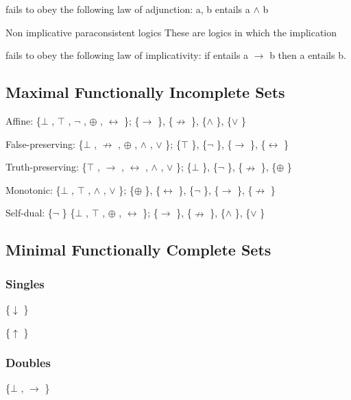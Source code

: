 fails to obey the following law of adjunction: a, b entails a $\land$  b

Non implicative paraconsistent logics These are logics in which the
implication

fails to obey the following law of implicativity: if entails a $\to$  b then
a entails b.

\hypertarget{maximal-functionally-incomplete-sets}{%
\subsection{Maximal Functionally Incomplete
Sets}\label{maximal-functionally-incomplete-sets}}

Affine: \{$\bot$ , $\top$ , $\neg$ , $\oplus$ , $\leftrightarrow$ \}; \{$\to$ \}, \{$\nrightarrow$ \}, \{$\land$ \}, \{$\lor$ \}

False-preserving: \{$\bot$ , $\nrightarrow$ , $\oplus$ , $\land$ , $\lor$ \}; \{$\top$ \}, \{$\neg$ \}, \{$\to$ \}, \{$\leftrightarrow$ \}

Truth-preserving: \{$\top$ , $\to$ , $\leftrightarrow$ , $\land$ , $\lor$ \}; \{$\bot$ \}, \{$\neg$ \}, \{$\nrightarrow$ \}, \{$\oplus$ \}

Monotonic: \{$\bot$ , $\top$ , $\land$ , $\lor$ \}; \{$\oplus$ \}, \{$\leftrightarrow$ \}, \{$\neg$ \}, \{$\to$ \}, \{$\nrightarrow$ \}

Self-dual: \{$\neg$ \} \{$\bot$ , $\top$ , $\oplus$ , $\leftrightarrow$ \}; \{$\to$ \}, \{$\nrightarrow$ \}, \{$\land$ \}, \{$\lor$ \}

\hypertarget{minimal-functionally-complete-sets}{%
\subsection{Minimal Functionally Complete
Sets}\label{minimal-functionally-complete-sets}}

\hypertarget{singles}{%
\subsubsection{Singles}\label{singles}}

\{$\downarrow$ \}

\{$\uparrow$ \}

\hypertarget{doubles}{%
\subsubsection{Doubles}\label{doubles}}

\{$\bot$ , $\to$ \}

